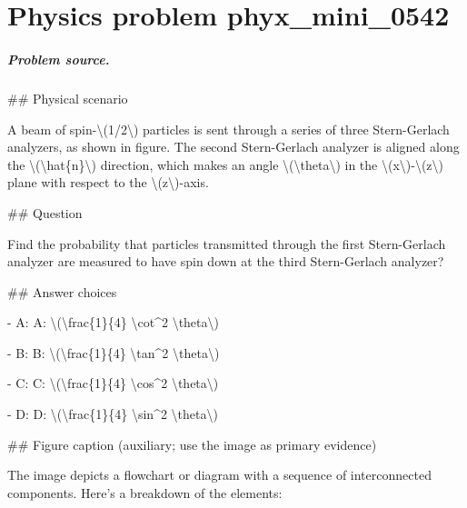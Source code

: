 
\chapter{Physics problem phyx\_mini\_0542}
\label{ch:PhyXMiniProblems_problem_phyx_mini_0542}

\paragraph{Problem source.}
\#\# Physical scenario

A beam of spin-\textbackslash{}(1/2\textbackslash{}) particles is sent through a series of three Stern-Gerlach analyzers, as shown in figure. The second Stern-Gerlach analyzer is aligned along the \textbackslash{}(\textbackslash{}hat\{n\}\textbackslash{}) direction, which makes an angle \textbackslash{}(\textbackslash{}theta\textbackslash{}) in the \textbackslash{}(x\textbackslash{})-\textbackslash{}(z\textbackslash{}) plane with respect to the \textbackslash{}(z\textbackslash{})-axis.

\#\# Question

Find the probability that particles transmitted through the first Stern-Gerlach analyzer are measured to have spin down at the third Stern-Gerlach analyzer?

\#\# Answer choices

- A: A: \textbackslash{}(\textbackslash{}frac\{1\}\{4\} \textbackslash{}cot\textasciicircum{}2 \textbackslash{}theta\textbackslash{})

- B: B: \textbackslash{}(\textbackslash{}frac\{1\}\{4\} \textbackslash{}tan\textasciicircum{}2 \textbackslash{}theta\textbackslash{})

- C: C: \textbackslash{}(\textbackslash{}frac\{1\}\{4\} \textbackslash{}cos\textasciicircum{}2 \textbackslash{}theta\textbackslash{})

- D: D: \textbackslash{}(\textbackslash{}frac\{1\}\{4\} \textbackslash{}sin\textasciicircum{}2 \textbackslash{}theta\textbackslash{})

\#\# Figure caption (auxiliary; use the image as primary evidence)

The image depicts a flowchart or diagram with a sequence of interconnected components. Here's a breakdown of the elements:

